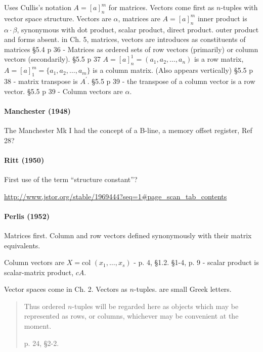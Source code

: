 Uses Cullis's notation $A = {[a]}^m_n$ for matrices.
Vectors come first as $n$-tuples with vector space structure.
Vectors are $\alpha$, matrices are $A = {[a]}^m_n$
inner product is $\alpha \cdot \beta$, synonymous with dot product, scalar product, direct product.
outer product and forms absent.
in Ch. 5, matrices, vectors are introduces as constituents of matrices
\S 5.4 p 36 - Matrices as ordered sets of row vectors (primarily) or column vectors (secondarily).
\S 5.5 p 37 $A = {[a]}^1_n = (a_1, a_2, \dots, a_n)$ is a row matrix,
$A = {[a]}^m_1 = \{a_1, a_2, \dots, a_m \}$ is a column matrix. (Also appears vertically)
\S 5.5 p 38 - matrix transpose is $A^\prime$.
\S 5.5 p 39 - the transpose of a column vector is a row vector.
\S 5.5 p 39 - Column vectors are $\alpha$.



\paragraph{Manchester (1948)}

The Manchester Mk I had the concept of a B-line, a memory offset register, Ref 28?



\paragraph{Ritt (1950)~\cite{Ritt1950}}

First use of the term ``structure constant''?

\url{http://www.jstor.org/stable/1969444?seq=1#page_scan_tab_contents}


\paragraph{Perlis (1952)~\cite{Perlis1952}}

Matrices first. Column and row vectors defined synonymously with their matrix equivalents.

Column vectors are $X = \textrm{col }(x_1, \dots, x_s)$ - p. 4, \S 1.2.
\S 1-4, p. 9 - scalar product is scalar-matrix product, $c A$.

Vector spaces come in Ch. 2. Vectors as $n$-tuples. are small Greek letters.

\begin{quote}
Thus ordered $n$-tuples will be regarded here as objects which may be
represented as rows, or columns, whichever may be convenient at the moment.

p. 24, \S2-2.
\end{quote}




